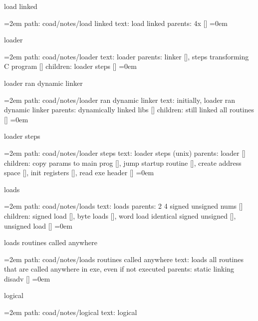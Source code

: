\bigskip
{}
load linked
\smallskip
\par\begingroup
\leftskip=2em
path: coad/notes/load linked
\smallskip
text:  load linked
\smallskip
parents:  4x []
\smallskip
\leftskip=0em
\par\endgroup
\bigskip
{}
loader
\smallskip
\par\begingroup
\leftskip=2em
path: coad/notes/loader
\smallskip
text:  loader
\smallskip
parents:  linker [], steps transforming C program []
\smallskip
children: loader steps []
\smallskip
\leftskip=0em
\par\endgroup
\bigskip
{}
loader ran dynamic linker
\smallskip
\par\begingroup
\leftskip=2em
path: coad/notes/loader ran dynamic linker
\smallskip
text:  initially, loader ran dynamic linker
\smallskip
parents:  dynamically linked libs []
\smallskip
children: still linked all routines []
\smallskip
\leftskip=0em
\par\endgroup
\bigskip
{}
loader steps
\smallskip
\par\begingroup
\leftskip=2em
path: coad/notes/loader steps
\smallskip
text:  loader steps (unix)
\smallskip
parents:  loader []
\smallskip
children: copy params to main prog [], jump startup routine [], create address space [], init registers [], read exe header []
\smallskip
\leftskip=0em
\par\endgroup
\bigskip
{}
loads
\smallskip
\par\begingroup
\leftskip=2em
path: coad/notes/loads
\smallskip
text:  loads
\smallskip
parents:  2 4 signed unsigned nums []
\smallskip
children: signed load [], byte loads [], word load identical signed unsigned [], unsigned load []
\smallskip
\leftskip=0em
\par\endgroup
\bigskip
{}
loads routines called anywhere
\smallskip
\par\begingroup
\leftskip=2em
path: coad/notes/loads routines called anywhere
\smallskip
text:  loads all routines that are called anywhere in exe, even if not executed
\smallskip
parents:  static linking disadv []
\smallskip
\leftskip=0em
\par\endgroup
\bigskip
{}
logical
\smallskip
\par\begingroup
\leftskip=2em
path: coad/notes/logical
\smallskip
text:  logical
